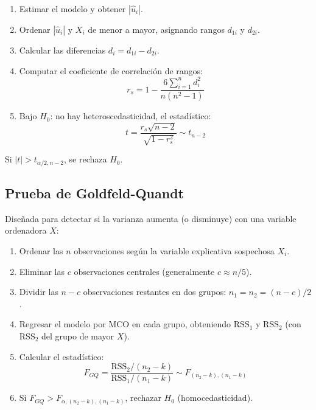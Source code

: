 \documentclass[12pt,a4paper]{report}
\theoremstyle{definition}
\theoremstyle{remark}
\newcommand{\uhat}{\hat{u}}
\begin{document}
\begin{tcolorbox}[notastyle, title={Procedimiento: Correlación de Spearman}]
  \begin{enumerate}[label=\textbf{Paso \arabic*:}]
    \item Estimar el modelo y obtener $|\uhat_i|$.
    \item Ordenar $|\uhat_i|$ y $X_i$ de menor a mayor, asignando rangos $d_{1i}$ y $d_{2i}$.
    \item Calcular las diferencias $d_i = d_{1i} - d_{2i}$.
    \item Computar el coeficiente de correlación de rangos:
    \begin{equation}
      r_s = 1 - \frac{6\sum_{i=1}^n d_i^2}{n(n^2 - 1)}
      \label{eq:spearman}
    \end{equation}
    \item Bajo $H_0$: no hay heteroscedasticidad, el estadístico:
    \begin{equation}
      t = \frac{r_s \sqrt{n-2}}{\sqrt{1-r_s^2}} \sim t_{n-2}
      \label{eq:spearman_t}
    \end{equation}
  \end{enumerate}
  Si $|t| > t_{\alpha/2, n-2}$, se rechaza $H_0$.
\end{tcolorbox}

\subsection{Prueba de Goldfeld-Quandt}

Diseñada para detectar si la varianza aumenta (o disminuye) con una variable ordenadora $X$:

\begin{tcolorbox}[notastyle, title={Procedimiento: Goldfeld-Quandt}]
  \begin{enumerate}[label=\textbf{Paso \arabic*:}]
    \item Ordenar las $n$ observaciones según la variable explicativa sospechosa $X_i$.
    \item Eliminar las $c$ observaciones centrales (generalmente $c \approx n/5$).
    \item Dividir las $n - c$ observaciones restantes en dos grupos: $n_1 = n_2 = (n-c)/2$.
    \item Regresar el modelo por MCO en cada grupo, obteniendo $\text{RSS}_1$ y $\text{RSS}_2$ (con $\text{RSS}_2$ del grupo de mayor $X$).
    \item Calcular el estadístico:
    \begin{equation}
      F_{GQ} = \frac{\text{RSS}_2 / (n_2 - k)}{\text{RSS}_1 / (n_1 - k)} \sim F_{(n_2 - k), (n_1 - k)}
      \label{eq:gq_stat}
    \end{equation}
    \item Si $F_{GQ} > F_{\alpha, (n_2-k), (n_1-k)}$, rechazar $H_0$ (homocedasticidad).
  \end{enumerate}
\end{tcolorbox}
\end{document}
